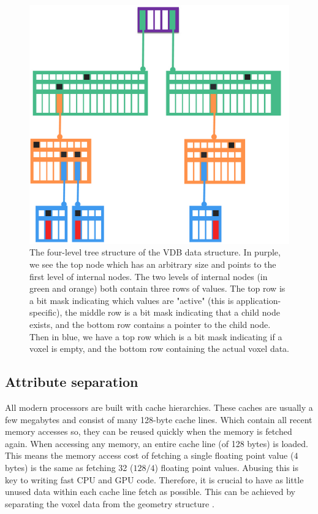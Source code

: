 \begin{figure}
    \centering
    \includegraphics[width=\linewidth]{figures/OpenVDB.png}
    \caption{The four-level tree structure of the VDB data structure. In purple, we see the top node which has an arbitrary size and points to the first level of internal nodes. The two levels of internal nodes (in green and orange) both contain three rows of values. The top row is a bit mask indicating which values are "active" (this is application-specific), the middle row is a bit mask indicating that a child node exists, and the bottom row contains a pointer to the child node. Then in blue, we have a top row which is a bit mask indicating if a voxel is empty, and the bottom row containing the actual voxel data. \cite{museth2013vdb}}
    \vspace{-30pt}
    \label{fig:VDB}
\end{figure}




\subsection{Attribute separation} \label{related_work:attribute_separation}
All modern processors are built with cache hierarchies. These caches are usually a few megabytes and consist of many 128-byte cache lines. Which contain all recent memory accesses so, they can be reused quickly when the memory is fetched again. When accessing any memory, an entire cache line (of 128 bytes) is loaded. This means the memory access cost of fetching a single floating point value ($4$ bytes) is the same as fetching 32 ($128/4$) floating point values. Abusing this is key to writing fast CPU and GPU code. Therefore, it is crucial to have as little unused data within each cache line fetch as possible. This can be achieved by separating the voxel data from the geometry structure \cite{dado2016geometry}.
